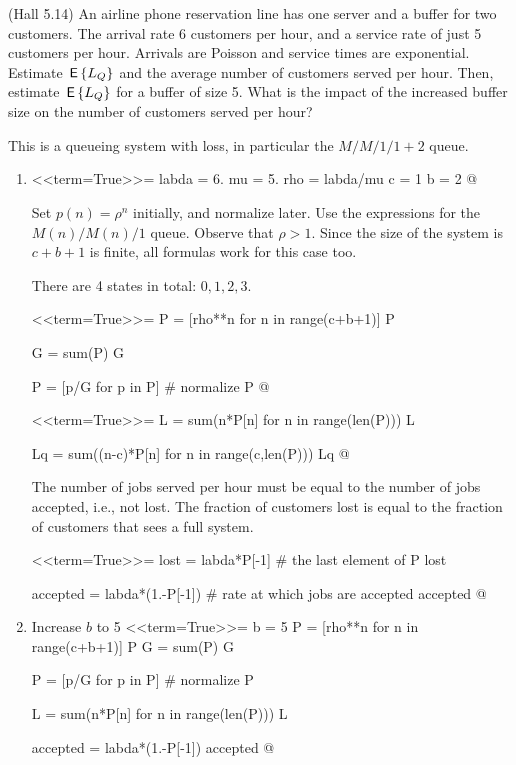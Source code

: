 \begin{exercise}
  (Hall 5.14) An airline phone reservation line has one server and a
  buffer for two customers. The arrival rate 6 customers per hour, and
  a service rate of just 5 customers per hour. Arrivals are Poisson and service times are exponential. 
 Estimate $\,\mathsf{E}\left\{L_Q\right\}$ and the average number of customers served per hour. Then, estimate $\,\mathsf{E}\left\{L_Q\right\}$ for a buffer of size 5. What is the impact of the increased buffer size on the number of customers served per hour?
  \begin{hint}
This is a queueing system with loss, in particular the $M/M/1/1+2$ queue.
  \end{hint}
    \begin{solution}
      \begin{enumerate}
      \item 

<<term=True>>=
labda = 6.
mu = 5.
rho = labda/mu
c = 1
b = 2
@ 

Set $p(n) = \rho^n$ initially, and normalize later. Use the
expressions for the $M(n)/M(n)/1$ queue.  Observe that $\rho>1$. Since
the size of the system is $c+b+1$ is finite, all formulas work for
this case too.


There are 4 states in total: $0,1,2,3$.

<<term=True>>=
P = [rho**n for n in range(c+b+1)]
P

G = sum(P)
G

P = [p/G for p in P] # normalize
P
@ 

<<term=True>>=
L = sum(n*P[n] for n in range(len(P)))
L

Lq = sum((n-c)*P[n] for n in range(c,len(P)))
Lq
@ 


The number of jobs served per hour must be equal to the number of jobs
accepted, i.e., not lost. The fraction of customers lost is equal to
the fraction of customers that sees a full system.

<<term=True>>=
lost = labda*P[-1] # the last element of P
lost

accepted = labda*(1.-P[-1]) # rate at which jobs are accepted
accepted
@  

\item 

 Increase $b$ to 5
<<term=True>>=
b = 5
P = [rho**n for n in range(c+b+1)]
P
G = sum(P)
G

P = [p/G for p in P] # normalize
P

L = sum(n*P[n] for n in range(len(P)))
L

accepted = labda*(1.-P[-1])
accepted
@      
  \end{enumerate}
    \end{solution}
\end{exercise}

